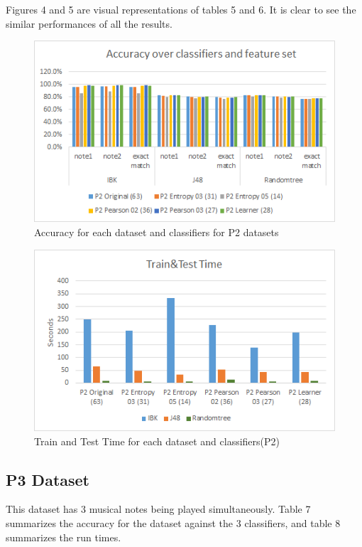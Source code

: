 \documentclass{article}
\begin{document}
Figures 4 and 5 are visual representations of tables 5 and 6. It is clear to see the similar performances of all the results.

\begin{figure}[h]
\includegraphics[scale=.65]{accuracy_p2}
 \caption{Accuracy for each dataset and classifiers for P2 datasets}
\label{figure2}
\end{figure}

\begin{figure}[h]
\includegraphics[scale=.65]{time_p2}
 \caption{Train and Test Time for each dataset and classifiers(P2)}
\label{figure2}
\end{figure}




\subsection{P3 Dataset}
This dataset has 3 musical notes being played simultaneously. Table 7 summarizes the accuracy for the dataset against the 3 classifiers, and table 8 summarizes the run times.
\end{document}
